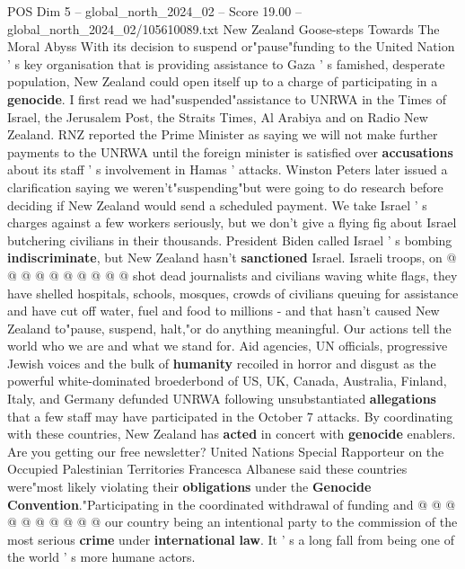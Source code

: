 \begin{textsample}{POS Dim 5 – global\_north\_2024\_02 – Score 19.00 – global\_north\_2024\_02/105610089.txt}  \label{ex:f5_pos_245}
New Zealand Goose-steps Towards The Moral Abyss With its decision to suspend or"pause"funding to the United Nation ' s key organisation that is providing assistance to Gaza ' s famished, desperate population, New Zealand could open itself up to a charge of participating in a \textbf{genocide}.
I first read we had"suspended"assistance to UNRWA in the Times of Israel, the Jerusalem Post, the Straits Times, Al Arabiya and on Radio New Zealand.
RNZ reported the Prime Minister as saying we will not make further payments to the UNRWA until the foreign minister is satisfied over \textbf{accusations} about its staff ' s involvement in Hamas ' attacks.
Winston Peters later issued a clarification saying we weren't"suspending"but were going to do research before deciding if New Zealand would send a scheduled payment.
We take Israel ' s charges against a few workers seriously, but we don't give a flying fig about Israel butchering civilians in their thousands.
President Biden called Israel ' s bombing \textbf{indiscriminate}, but New Zealand hasn't \textbf{sanctioned} Israel.
Israeli troops, on @ @ @ @ @ @ @ @ @ @ shot dead journalists and civilians waving white flags, they have shelled hospitals, schools, mosques, crowds of civilians queuing for assistance and have cut off water, fuel and food to millions - and that hasn't caused New Zealand to"pause, suspend, halt,"or do anything meaningful.
Our actions tell the world who we are and what we stand for.
Aid agencies, UN officials, progressive Jewish voices and the bulk of \textbf{humanity} recoiled in horror and disgust as the powerful white-dominated broederbond of US, UK, Canada, Australia, Finland, Italy, and Germany defunded UNRWA following unsubstantiated \textbf{allegations} that a few staff may have participated in the October 7 attacks.
By coordinating with these countries, New Zealand has \textbf{acted} in concert with \textbf{genocide} enablers.
Are you getting our free newsletter?
United Nations Special Rapporteur on the Occupied Palestinian Territories Francesca Albanese said these countries were"most likely violating their \textbf{obligations} under the \textbf{Genocide} \textbf{Convention}."Participating in the coordinated withdrawal of funding and @ @ @ @ @ @ @ @ @ @ our country being an intentional party to the commission of the most serious \textbf{crime} under \textbf{international} \textbf{law}.
It ' s a long fall from being one of the world ' s more humane actors.

\end{textsample}
